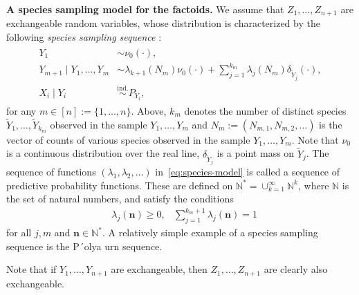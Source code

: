 \documentclass[11pt]{article}
\begin{document}
\textbf{A species sampling model for the factoids.}
We assume that $Z_1,\ldots,Z_{n+1}$ are exchangeable random variables, whose distribution is characterized by the following {\em species sampling sequence} \cite{pitman2006combinatorial,hansen2000prediction,lee2013defining}:
\begin{align} \label{eq:species-model}
\begin{split}
  Y_1 & \sim \nu_0(\cdot), \\
  Y_{m+1} \mid Y_1, \ldots, Y_m & \sim \lambda_{k+1}(N_m) \nu_0(\cdot) + \sum_{j=1}^{k_m} \lambda_j(N_m) \delta_{\tilde{Y}_j}(\cdot), \\
  X_i \mid Y_i & \overset{\text{ind.}}{\sim} P_{Y_i},
\end{split}
\end{align}
for any $m \in [n] := \{1,\ldots,n\}$. Above, $k_m$ denotes the number of distinct species $\tilde{Y}_1,\ldots,\tilde{Y}_{k_m}$ observed in the sample $Y_1,\ldots,Y_m$ and $N_m := (N_{m,1}, N_{m,2}, \ldots)$ is the vector of counts of various species observed in the sample $Y_1,\ldots,Y_m$.
Note that $\nu_0$ is a continuous distribution over the real line, $\delta_{\tilde{Y}_j}$ is a point mass on $\tilde{Y}_j$.
The sequence of functions $(\lambda_1, \lambda_2, \ldots)$ in~\eqref{eq:species-model} is called a sequence of predictive probability functions. 
These are defined on $\mathbb{N}^{*} = \cup_{k=1}^{\infty} \mathbb{N}^k$, where $\mathbb{N}$ is the set of natural numbers, and satisfy the conditions
\begin{align*}
& \lambda_j(\mathbf{n}) \geq 0,
& \sum_{j=1}^{k_m+1} \lambda_j(\mathbf{n}) =1
\end{align*}
for all $j,m$ and $\mathbf{n} \in \mathbb{N}^*$.
A relatively simple example of a species sampling sequence is the P´olya urn sequence.

Note that if $Y_1, \ldots, Y_{n+1}$ are exchangeable, then $Z_1, \ldots, Z_{n+1}$ are clearly also exchangeable.
\end{document}
